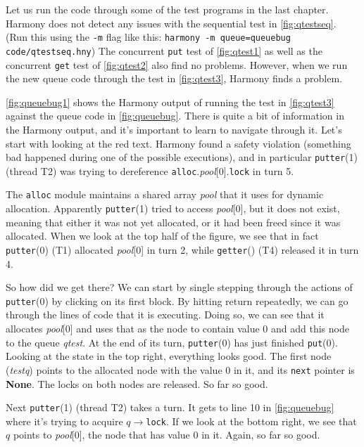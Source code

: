 \documentclass{report}
\begin{document}
Let us run the code through some of the test programs in the last
chapter.  Harmony does not detect any issues with the sequential test
in \autoref{fig:qtestseq}.
(Run this using the \texttt{-m} flag like this:
\texttt{harmony -m queue=queuebug code/qtestseq.hny})
The concurrent \texttt{put} test of
\autoref{fig:qtest1} as well as the concurrent \texttt{get} test of
\autoref{fig:qtest2} also find no problems.  However, when we run
the new queue code through the test in \autoref{fig:qtest3}, Harmony
finds a problem.

\autoref{fig:queuebug1} shows the Harmony output of running
the test in \autoref{fig:qtest3} against the queue code
in \autoref{fig:queuebug}.
There is quite a bit of information in the Harmony output, and it's
important to learn to navigate through it.
Let's start with looking at the red text.  Harmony found a safety
violation (something bad happened during one of the possible executions),
and in particular \texttt{putter}(1) (thread T2) was trying to dereference
\texttt{alloc}.\textit{pool}[0].\texttt{lock} in turn 5.

The \texttt{alloc} module maintains a shared array \textit{pool} that
it uses for dynamic allocation.  Apparently \texttt{putter}(1) tried to access
\textit{pool}[0], but it does not exist, meaning that either it was not
yet allocated, or it had been freed since it was allocated.
When we look at the top half of the figure, we see that in fact
\texttt{putter}(0) (T1) allocated \textit{pool}[0] in turn 2, while
\texttt{getter}() (T4) released it in turn 4.

So how did we get there?  We can start by single stepping through the
actions of \texttt{putter}(0) by clicking on its first block.
By hitting return repeatedly, we can go through the lines of code that
it is executing.  Doing so, we can see that it allocates
\textit{pool}[0] and uses that as the node to contain value 0 and add
this node to the queue \textit{qtest}.  At the end of its turn,
\texttt{putter}(0) has just finished \texttt{put}(0).  Looking at the
state in the top right, everything looks good.  The first node
(\textit{testq}) points to the allocated node with the value 0 in it,
and its \texttt{next} pointer is \textbf{None}.  The locks on both nodes
are released.  So far so good.

Next \texttt{putter}(1) (thread T2) takes a turn.  It gets to line 10 in
\autoref{fig:queuebug} where it's trying to acquire
$q$$\rightarrow$\texttt{lock}.  If we look at the bottom right,
we see that $q$ points to \textit{pool}[0], the node that has value 0
in it.  Again, so far so good.
\end{document}
